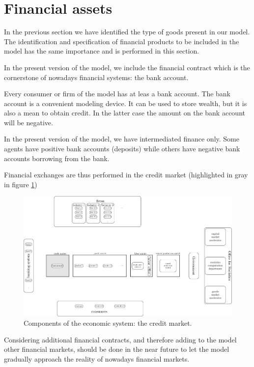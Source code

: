 \documentclass{book}
\begin{document}
\clearpage
\section{Financial assets}

In the previous section we have identified the type of goods present in our model. The identification and specification of financial products to be included in the model has the same importance and is performed in this section. 

In the present version of the model, we include the financial contract which is the cornerstone of nowadays financial systems: the bank account.

Every consumer or firm of the model has at leas a bank account. The bank account is a convenient modeling device. It can be used to store wealth, but it is also a mean to obtain credit. In the latter case the amount on the bank account will be negative.

In the present version of the model, we have intermediated finance only. Some agents have positive bank accounts (deposits) while others have negative bank accounts borrowing from the bank. 

Financial exchanges are thus performed in the credit market (highlighted in gray in figure \ref{fig:componentsc3})

\begin{figure}[htp]
\hskip-1cm\includegraphics[scale=0.5]{agents_and_interactions_figure1c3-0.pdf}
	\caption{Components of the economic system: the credit market.}
	\label{fig:componentsc3}
\end{figure}

Considering additional financial contracts, and therefore adding to the model other financial markets, should be done in the near future to let the model gradually approach the reality of nowadays financial markets.
\end{document}
